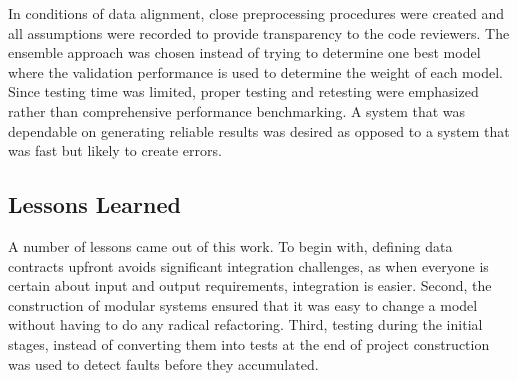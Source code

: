 In conditions of data alignment, close preprocessing procedures were created and all assumptions were recorded to provide transparency to the code reviewers. The ensemble approach was chosen instead of trying to determine one best model where the validation performance is used to determine the weight of each model. Since testing time was limited, proper testing and retesting were emphasized rather than comprehensive performance benchmarking. A system that was dependable on generating reliable results was desired as opposed to a system that was fast but likely to create errors.

\subsection{Lessons Learned}
A number of lessons came out of this work. To begin with, defining data contracts upfront avoids significant integration challenges, as when everyone is certain about input and output requirements, integration is easier. Second, the construction of modular systems ensured that it was easy to change a model without having to do any radical refactoring. Third, testing during the initial stages, instead of converting them into tests at the end of project construction was used to detect faults before they accumulated.
